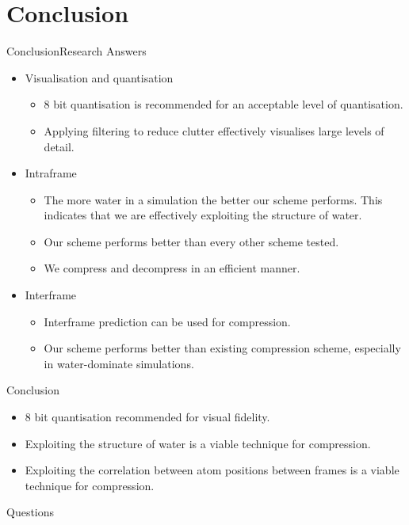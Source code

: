 \documentclass{beamer}
\begin{document}
\section{Conclusion}
\begin{frame}{Conclusion}{Research Answers}

  \begin{itemize}

  \item Visualisation and quantisation
    \begin{itemize}
    \item 8 bit quantisation is recommended for an acceptable level of
      quantisation.
    \item Applying filtering to reduce clutter effectively visualises large
      levels of detail.
    \end{itemize}

  \item Intraframe
    \begin{itemize}
    \item The more water in a simulation the better our scheme performs. This
      indicates that we are effectively exploiting the structure of water.
    \item Our scheme performs better than every other scheme tested.
    \item We compress and decompress in an efficient manner.
    \end{itemize}

  \item Interframe
    \begin{itemize}
      \item Interframe prediction can be used for compression.
      \item Our scheme performs better than existing compression scheme,
        especially in water-dominate simulations.
    \end{itemize}

  \end{itemize}
\end{frame}

\begin{frame}{Conclusion}

\begin{itemize}
 \item 8 bit quantisation recommended for visual fidelity.
 \item Exploiting the structure of water is a viable technique for compression.
 \item Exploiting the correlation between atom positions between frames is a viable technique for compression.
\end{itemize}

\end{frame}


\begin{frame}{Questions}
  \begin{center}
  \end{center}
\end{frame}
\end{document}
